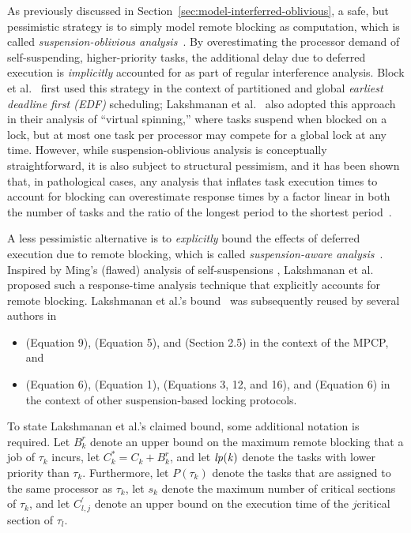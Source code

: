 As previously discussed in Section~\ref{sec:model-interferred-oblivious},
a safe, but pessimistic strategy is to simply model remote blocking as computation, which is called \emph{suspension-oblivious analysis}~\cite{BA:10b}. By overestimating the processor demand of self-suspending, higher-priority tasks, the additional delay due to deferred execution is \emph{implicitly} accounted for as part of regular interference analysis. Block et al.~\cite{block-2007} first used this strategy in the context of partitioned and global \emph{earliest deadline first (EDF)} scheduling; Lakshmanan et al.~\cite{lakshmanan-2009} also adopted this approach in their analysis of ``virtual spinning,'' where tasks suspend when blocked on a lock, but at most one task per processor may compete for a global lock at any time. However, while suspension-oblivious analysis is conceptually straightforward, it is also subject to structural pessimism, and it has been shown that, in pathological cases, any analysis that inflates task execution times to account for blocking can overestimate response times by a factor linear in both the number of tasks and the ratio of the longest period to the shortest period~\cite{wieder-2013}.

A less pessimistic alternative is to \emph{explicitly} bound the effects of deferred execution due to remote blocking, which is called \emph{suspension-aware analysis}~\cite{BA:10b}. Inspired by Ming's (flawed) analysis of self-suspensions  \cite{MingLiRTCSA1994}, Lakshmanan et al.~\cite{lakshmanan-2009} proposed such a response-time analysis technique that explicitly accounts for remote blocking.  Lakshmanan et al.'s  bound~\cite{lakshmanan-2009} was subsequently reused by several authors in
\begin{itemize}
\item \cite{zeng-2011} (Equation 9), \cite{han-2014} (Equation 5), and \cite{yang-2014} (Section 2.5) in the context of the MPCP, and
\item \cite{yang-2013} (Equation 6), \cite{bbb-2013} (Equation 1), \cite{carminati-2014} (Equations 3, 12, and 16), and \cite{kim-2014} (Equation 6)  in the context of other suspension-based locking protocols.
\end{itemize}

To state  Lakshmanan et al.'s claimed bound, some additional notation is required. Let $B_k^r$ denote an upper bound on the maximum remote blocking that a job of $\tau_k$ incurs, let $C_k^{\ast} = C_k + B_k^r$, and let $\mathit{lp(k)}$ denote the tasks with lower priority than $\tau_k$. Furthermore, let $P(\tau_k)$ denote the tasks that are assigned to the same processor as $\tau_k$, let $s_k$ denote the maximum number of critical sections of $\tau_k$, and let $C_{l,j}^{\prime}$ denote an upper bound on the execution time of the $j$\xth critical section of $\tau_l$.


